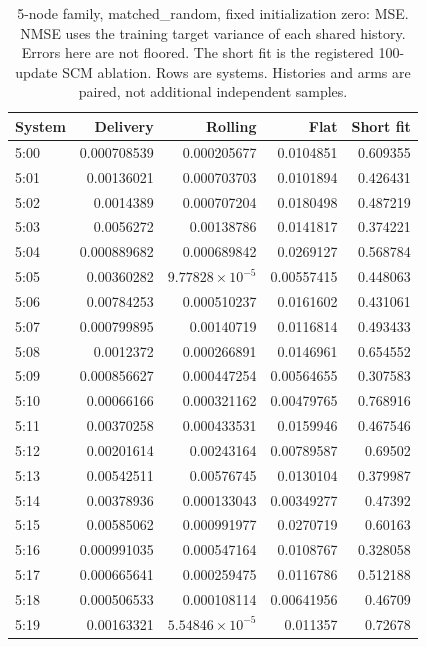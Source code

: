 \begin{table}[ht]
\centering\scriptsize
\begin{tabular}{lrrrr}
\toprule
System & Delivery & Rolling & Flat & Short fit\\
\midrule
5:00 & 0.000708539 & 0.000205677 & 0.0104851 & 0.609355\\
5:01 & 0.00136021 & 0.000703703 & 0.0101894 & 0.426431\\
5:02 & 0.0014389 & 0.000707204 & 0.0180498 & 0.487219\\
5:03 & 0.0056272 & 0.00138786 & 0.0141817 & 0.374221\\
5:04 & 0.000889682 & 0.000689842 & 0.0269127 & 0.568784\\
5:05 & 0.00360282 & $9.77828\times10^{-5}$ & 0.00557415 & 0.448063\\
5:06 & 0.00784253 & 0.000510237 & 0.0161602 & 0.431061\\
5:07 & 0.000799895 & 0.00140719 & 0.0116814 & 0.493433\\
5:08 & 0.0012372 & 0.000266891 & 0.0146961 & 0.654552\\
5:09 & 0.000856627 & 0.000447254 & 0.00564655 & 0.307583\\
5:10 & 0.00066166 & 0.000321162 & 0.00479765 & 0.768916\\
5:11 & 0.00370258 & 0.000433531 & 0.0159946 & 0.467546\\
5:12 & 0.00201614 & 0.00243164 & 0.00789587 & 0.69502\\
5:13 & 0.00542511 & 0.00576745 & 0.0130104 & 0.379987\\
5:14 & 0.00378936 & 0.000133043 & 0.00349277 & 0.47392\\
5:15 & 0.00585062 & 0.000991977 & 0.0270719 & 0.60163\\
5:16 & 0.000991035 & 0.000547164 & 0.0108767 & 0.328058\\
5:17 & 0.000665641 & 0.000259475 & 0.0116786 & 0.512188\\
5:18 & 0.000506533 & 0.000108114 & 0.00641956 & 0.46709\\
5:19 & 0.00163321 & $5.54846\times10^{-5}$ & 0.011357 & 0.72678\\
\bottomrule
\end{tabular}
\caption{5-node family, matched\_random, fixed initialization zero: MSE. NMSE uses the training target variance of each shared history. Errors here are not floored. The short fit is the registered 100-update SCM ablation. Rows are systems. Histories and arms are paired, not additional independent samples.}
\end{table}
